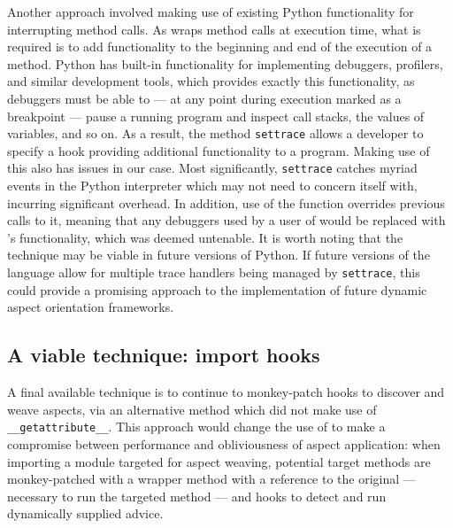 Another approach involved making use of existing Python functionality for
interrupting method calls. As \pdsf{} wraps method calls at execution time, what
is required is to add functionality to the beginning and end of the execution of
a method. Python has built-in functionality for implementing debuggers,
profilers, and similar development tools, which provides exactly this
functionality, as debuggers must be able to --- at any point during execution
marked as a breakpoint --- pause a running program and inspect call stacks, the
values of variables, and so on. As a result, the method \lstinline{settrace}
allows a developer to specify a hook providing additional functionality to a
program. Making use of this also has issues in our case. Most significantly,
\lstinline{settrace} catches myriad events in the Python interpreter which
\pdsf{} may not need to concern itself with, incurring significant overhead. In
addition, use of the function overrides previous calls to it, meaning that any
debuggers used by a user of \pdsf{} would be replaced with \pdsf{}'s
functionality, which was deemed untenable. It is worth noting that the technique
may be viable in future versions of Python. If future versions of the
language allow for multiple trace handlers being managed by
\lstinline{settrace}, this could provide a promising approach to the
implementation of future dynamic aspect orientation frameworks.


\subsection{A viable technique: import hooks}\label{subsec:pdsf3importhookdiscussion}


A final available technique is to continue to monkey-patch hooks to discover and
weave aspects, via an alternative method which did not make use of
\lstinline{__getattribute__}. This approach would change the use of \pdsf{} to
make a compromise between performance and obliviousness of aspect application:
when importing a module targeted for aspect weaving, potential target methods
are monkey-patched with a wrapper method with a reference to the original ---
necessary to run the targeted method --- and hooks to detect and run dynamically
supplied advice.


